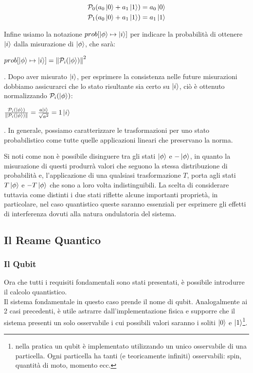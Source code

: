\documentclass[12pt,a4paper,openright]{report}
\newcommand{\norm}[1]{\left\lVert#1\right\rVert}
\begin{document}
    \begin{center}
        \begin{align*}
            &\mathcal{P}_0(a_0\ket0 + a_1\ket1) = a_0\ket0 \\
            &\mathcal{P}_1(a_0\ket0 + a_1\ket1) = a_1\ket1
        \end{align*}    
    \end{center}
Infine usiamo la notazione $prob[\ket{\phi} \mapsto \ket{i}]$ per indicare la probabilità di ottenere $\ket{i}$ dalla misurazione di $\ket{\phi}$, 
che sarà:
\begin{center}
    $prob[\ket{\phi} \mapsto \ket{i}] = \norm{\mathcal{P}_i(\ket{\phi})}^2$
\end{center}
. Dopo aver misurato $\ket{i}$, per esprimere la consistenza nelle future misurazioni dobbiamo assicurarci che lo stato risultante sia certo su $\ket{i}$,
ciò è ottenuto normalizzando $\mathcal{P}_i(\ket{\phi})$:
\begin{center}
    $\frac{\mathcal{P}_i(\ket{\phi})}{\norm{\mathcal{P}_i(\ket{\phi})}}=\frac{a\ket{i}}{\sqrt{a^2}}=1\ket{i}$
\end{center}
. In generale, possiamo caratterizzare le trasformazioni per uno stato probabilistico come tutte quelle applicazioni lineari che preservano la norma.\par
Si noti come non è possibile disinguere tra gli stati $\ket{\phi}$ e $-\ket{\phi}$, in quanto la misurazione di questi produrrà valori che seguono la stessa
distribuzione di probabilità e, l'applicazione di una qualsiasi trasformazione $T$, porta agli stati $T\ket{\phi}$ e $-T\ket{\phi}$ che sono a loro volta
indistinguibili. La scelta di considerare tuttavia come distinti i due stati riflette alcune importanti proprietà, in particolare, nel
caso quantistico queste saranno essenziali per esprimere gli effetti di interferenza dovuti alla natura ondulatoria del sistema.   

\subsection{Il Reame Quantico}
\subsubsection{Il Qubit}
Ora che tutti i requisiti fondamentali sono stati presentati, è possibile introdurre il calcolo quantistico.\\
Il sistema fondamentale in questo caso prende il nome di qubit. Analogalmente ai 2 casi precedenti, è utile astrarre dall'implementazione fisica
e supporre che il sistema presenti un solo osservabile i cui possibili valori saranno i soliti $\ket0$ e $\ket1$\footnote{nella pratica un qubit è implementato utilizzando un unico osservabile di una particella. Ogni particella ha tanti (e teoricamente infiniti) osservabili: spin, quantità di moto, momento ecc. }.
\end{document}

